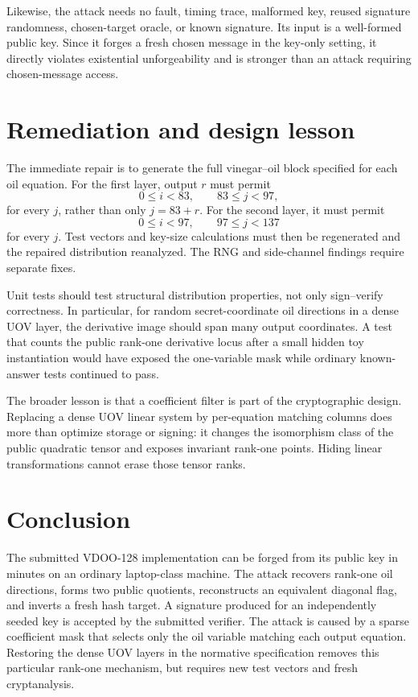 \documentclass[11pt]{article}
\begin{document}
Likewise, the attack needs no fault, timing trace, malformed key, reused
signature randomness, chosen-target oracle, or known signature.  Its input is
a well-formed public key.  Since it forges a fresh chosen message in the
key-only setting, it directly violates existential unforgeability and is
stronger than an attack requiring chosen-message access.

\section{Remediation and design lesson}

The immediate repair is to generate the full vinegar--oil block specified for
each oil equation.  For the first layer, output $r$ must permit
\[
  0\leq i<83,\qquad 83\leq j<97,
\]
for every $j$, rather than only $j=83+r$.  For the second layer, it must permit
\[
  0\leq i<97,\qquad 97\leq j<137
\]
for every $j$.  Test vectors and key-size calculations must then be regenerated
and the repaired distribution reanalyzed.  The RNG and side-channel findings
require separate fixes.

Unit tests should test structural distribution properties, not only
sign--verify correctness.  In particular, for random secret-coordinate oil
directions in a dense UOV layer, the derivative image should span many output
coordinates.  A test that counts the public rank-one derivative locus after a
small hidden toy instantiation would have exposed the one-variable mask while
ordinary known-answer tests continued to pass.

The broader lesson is that a coefficient filter is part of the cryptographic
design.  Replacing a dense UOV linear system by per-equation matching columns
does more than optimize storage or signing: it changes the isomorphism class
of the public quadratic tensor and exposes invariant rank-one points.  Hiding
linear transformations cannot erase those tensor ranks.

\section{Conclusion}

The submitted VDOO-128 implementation can be forged from its public key in
minutes on an ordinary laptop-class machine.  The attack recovers rank-one
oil directions, forms two public quotients, reconstructs an equivalent
diagonal flag, and inverts a fresh hash target.  A signature produced for an
independently seeded key is accepted by the submitted verifier.  The attack is
caused by a sparse coefficient mask that selects only the oil variable matching
each output equation.  Restoring the dense UOV layers in the normative
specification removes this particular rank-one mechanism, but requires new
test vectors and fresh cryptanalysis.
\end{document}
